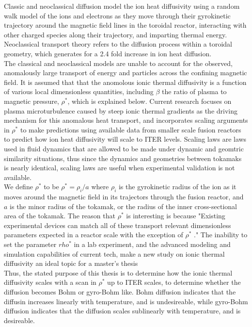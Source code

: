 \documentclass{article}
\begin{document}
Classic and neoclassical diffusion model the ion heat diffusivity using a random walk model of the ions and electrons as they move through their gyrokinetic trajectory around the magnetic field lines in the toroidal reactor, interacting with other charged species along their trajectory, and imparting thermal energy. Neoclassical transport theory refers to the diffusion process within a toroidal geometry, which generates for a 2.4 fold increase in ion heat diffusion.\\
The classical and neoclassical models are unable to account for the observed, anomalously large transport of energy and particles across the confining magnetic field. It is assumed that that the anomolous ionic thermal diffusivity is a function of various local dimensionless quantities, including $\beta$ the ratio of plasma to magnetic  pressure, $\rho^*$, which is explained below.  Current research \cite{Yas_Ido} focuses on plasma microturbulence caused by steep ionic thermal gradients as the driving mechanism for this anomalous heat transport, and incorporates scaling arguments in $\rho^*$ to make predictions using available data from smaller scale fusion reactors to predict how ion heat diffusivity will scale to ITER levels. Scaling laws are laws used in fluid dynamics that are allowed to be made under dynamic and geomtric similarity situations, thus since the dynamics and geometries between tokamaks is nearly identical, scaling laws are useful when experimental validation is not available.\\

We define $\rho^*$ to be $\rho^* = \rho_i/a$ where $\rho_i$ is the gyrokinetic radius of the ion as it moves around the magnetic field in its trajectors through the fusion reactor, and $a$ is the minor radius of the tokamak, or the radius of the inner cross-sectional area of the tokamak. The reason that $\rho^*$ is interesting is because "Existing experimental devices can match all of these transport relevant dimensionless parameters expected in a reactor scale with the exception of $\rho^*$ \cite{McKee_Et}." The inability to set the parameter $rho^*$ in a lab experiment, and the advanced modeling and simulation capabilities of current tech, make a new study on ionic thermal diffusivity an ideal topic for a master's thesis\\

Thus, the stated purpose of this thesis is to determine how the ionic thermal diffusivity scales with a scan in $\rho^*$ up to ITER scales, to determine whether the diffusion becomes Bohm or gyro-Bohm like. Bohm diffusion indicates that the diffusin increases linearly with temperature, and is undesireable, while gyro-Bohm diffusion indicates that the  diffusion scales sublinearly with temperature, and is desireable.
\end{document}
